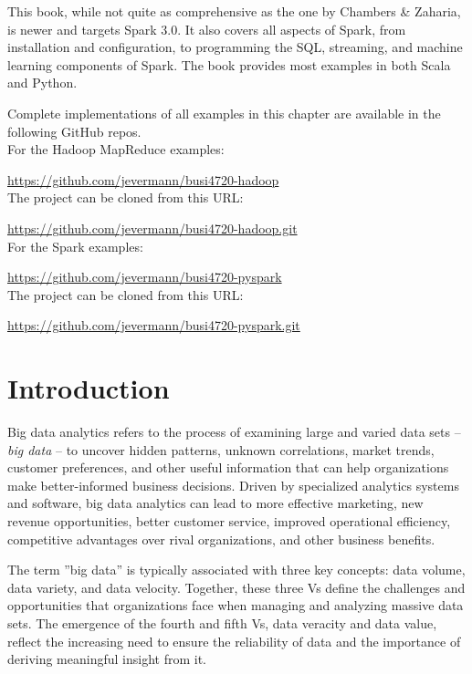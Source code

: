 This book, while not quite as comprehensive as the one by Chambers \& Zaharia, is newer and targets Spark 3.0. It also covers all aspects of Spark, from installation and configuration, to programming the SQL, streaming, and machine learning components of Spark. The book provides most examples in both Scala and Python.

\begin{withcode}
\begin{resourcebox}
Complete implementations of all examples in this chapter are available in the following GitHub repos.\\

For the Hadoop MapReduce examples:

\small\url{https://github.com/jevermann/busi4720-hadoop}\normalsize \\

The project can be cloned from this URL:

\small\url{https://github.com/jevermann/busi4720-hadoop.git}\normalsize \\

For the Spark examples:

\small\url{https://github.com/jevermann/busi4720-pyspark}\normalsize \\

The project can be cloned from this URL:

\small\url{https://github.com/jevermann/busi4720-pyspark.git}\normalsize \\
\end{resourcebox}
\end{withcode}

\section{Introduction}

Big data analytics refers to the process of examining large and varied data sets -- \emph{big data} -- to uncover hidden patterns, unknown correlations, market trends, customer preferences, and other useful information that can help organizations make better-informed business decisions. Driven by specialized analytics systems and software, big data analytics can lead to more effective marketing, new revenue opportunities, better customer service, improved operational efficiency, competitive advantages over rival organizations, and other business benefits.

The term ''big data'' is typically associated with three key concepts: data volume, data variety, and data velocity. Together, these three Vs define the challenges and opportunities that organizations face when managing and analyzing massive data sets. The emergence of the fourth and fifth Vs, data veracity and data value, reflect the increasing need to ensure the reliability of data and the importance of deriving meaningful insight from it.

